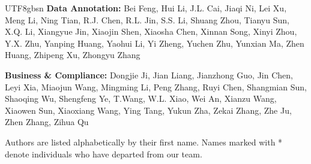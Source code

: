\documentclass[11pt, a4paper, logo, copyright, nonumbering]{deepseek}
\begin{document}
\begin{CJK*}{UTF8}{gbsn}
\noindent
\textbf{Data Annotation:}
Bei Feng,
Hui Li,
J.L. Cai,
Jiaqi Ni,
Lei Xu,
Meng Li,
Ning Tian,
R.J. Chen,
R.L. Jin,
S.S. Li,
Shuang Zhou,
Tianyu Sun,
X.Q. Li,
Xiangyue Jin,
Xiaojin Shen,
Xiaosha Chen,
Xinnan Song,
Xinyi Zhou,
Y.X. Zhu,
Yanping Huang,
Yaohui Li,
Yi Zheng,
Yuchen Zhu,
Yunxian Ma,
Zhen Huang,
Zhipeng Xu,
Zhongyu Zhang

\noindent
\textbf{Business \& Compliance:}
Dongjie Ji,
Jian Liang,
Jianzhong Guo,
Jin Chen,
Leyi Xia,
Miaojun Wang,
Mingming Li,
Peng Zhang,
Ruyi Chen,
Shangmian Sun,
Shaoqing Wu,
Shengfeng Ye,
T.Wang,
W.L. Xiao,
Wei An,
Xianzu Wang,
Xiaowen Sun,
Xiaoxiang Wang,
Ying Tang,
Yukun Zha,
Zekai Zhang,
Zhe Ju,
Zhen Zhang,
Zihua Qu

Authors are listed alphabetically by their first name. 
Names marked with * denote individuals who have departed from our team. 

\end{CJK*}
\end{document}
